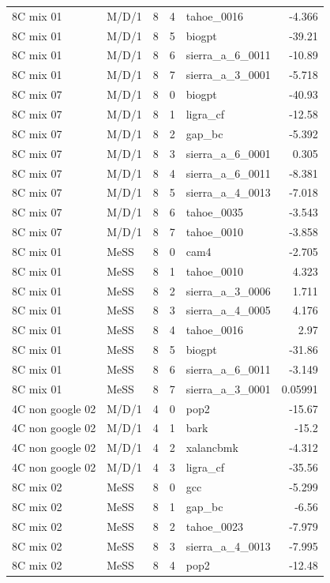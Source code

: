 \begin{tabular}{llrrlr}
8C mix 01 & M/D/1 & 8 & 4 & tahoe\_0016 & -4.366 \\
8C mix 01 & M/D/1 & 8 & 5 & biogpt & -39.21 \\
8C mix 01 & M/D/1 & 8 & 6 & sierra\_a\_6\_0011 & -10.89 \\
8C mix 01 & M/D/1 & 8 & 7 & sierra\_a\_3\_0001 & -5.718 \\
8C mix 07 & M/D/1 & 8 & 0 & biogpt & -40.93 \\
8C mix 07 & M/D/1 & 8 & 1 & ligra\_cf & -12.58 \\
8C mix 07 & M/D/1 & 8 & 2 & gap\_bc & -5.392 \\
8C mix 07 & M/D/1 & 8 & 3 & sierra\_a\_6\_0001 & 0.305 \\
8C mix 07 & M/D/1 & 8 & 4 & sierra\_a\_6\_0011 & -8.381 \\
8C mix 07 & M/D/1 & 8 & 5 & sierra\_a\_4\_0013 & -7.018 \\
8C mix 07 & M/D/1 & 8 & 6 & tahoe\_0035 & -3.543 \\
8C mix 07 & M/D/1 & 8 & 7 & tahoe\_0010 & -3.858 \\
8C mix 01 & MeSS & 8 & 0 & cam4 & -2.705 \\
8C mix 01 & MeSS & 8 & 1 & tahoe\_0010 & 4.323 \\
8C mix 01 & MeSS & 8 & 2 & sierra\_a\_3\_0006 & 1.711 \\
8C mix 01 & MeSS & 8 & 3 & sierra\_a\_4\_0005 & 4.176 \\
8C mix 01 & MeSS & 8 & 4 & tahoe\_0016 & 2.97 \\
8C mix 01 & MeSS & 8 & 5 & biogpt & -31.86 \\
8C mix 01 & MeSS & 8 & 6 & sierra\_a\_6\_0011 & -3.149 \\
8C mix 01 & MeSS & 8 & 7 & sierra\_a\_3\_0001 & 0.05991 \\
4C non google 02 & M/D/1 & 4 & 0 & pop2 & -15.67 \\
4C non google 02 & M/D/1 & 4 & 1 & bark & -15.2 \\
4C non google 02 & M/D/1 & 4 & 2 & xalancbmk & -4.312 \\
4C non google 02 & M/D/1 & 4 & 3 & ligra\_cf & -35.56 \\
8C mix 02 & MeSS & 8 & 0 & gcc & -5.299 \\
8C mix 02 & MeSS & 8 & 1 & gap\_bc & -6.56 \\
8C mix 02 & MeSS & 8 & 2 & tahoe\_0023 & -7.979 \\
8C mix 02 & MeSS & 8 & 3 & sierra\_a\_4\_0013 & -7.995 \\
8C mix 02 & MeSS & 8 & 4 & pop2 & -12.48 \\

\end{tabular}
